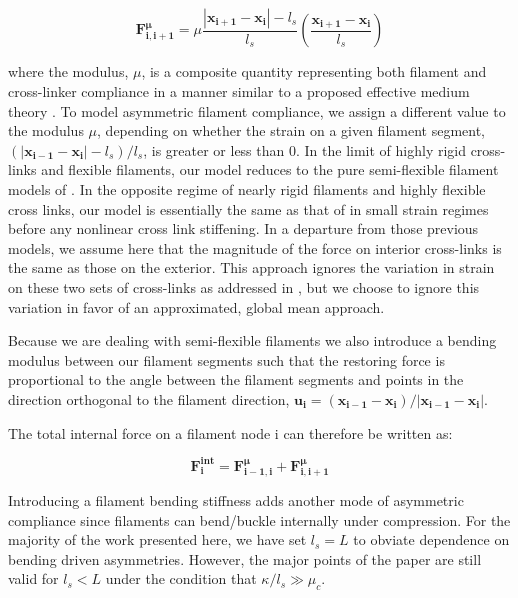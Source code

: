 \begin{equation}
\label{eqn:spring}
\mathbf{F^{\mu}_{i,i+1}} = \mu\frac{|\mathbf{x_{i+1}}-\mathbf{x_i}|-l_s}{l_s}\left ( \frac{\mathbf{x_{i+1}}-\mathbf{x_i}}{l_s}\right )
\end{equation}


where the modulus, $\mu$, is a composite quantity representing both filament and cross-linker compliance in a manner similar to a proposed effective medium theory \cite{theo_crosslinknonlinear}. To model asymmetric filament compliance, we assign a different value to the modulus $\mu$,  depending on whether the strain on a given filament segment, $(|\mathbf{x_{i-1}}-\mathbf{x_i}|-l_s)/l_s$, is greater or less than 0. In the limit of highly rigid cross-links and flexible filaments, our model reduces to the pure semi-flexible filament models of \cite{theo_hlm,theo_hlm2}. In the opposite regime of nearly rigid filaments and highly flexible cross links, our model is essentially the same as that of \cite{theo_crosslinknonlinear} in small strain regimes before any nonlinear cross link stiffening. In a departure from those previous models, we assume here that the magnitude of the force on interior cross-links is the same as those on the exterior. This approach ignores the variation in strain on these two sets of cross-links as addressed in \cite{theo_crosslinknonlinear}, but we choose to ignore this variation in favor of an approximated, global mean approach. 

Because we are dealing with semi-flexible filaments we also introduce a bending modulus between our filament segments such that the restoring force is proportional to the angle between the filament segments and points in the direction orthogonal to the filament direction, $\mathbf{u_i}=(\mathbf{x_{i-1}}-\mathbf{x_{i}})/|\mathbf{x_{i-1}}-\mathbf{x_{i}}|$.   


The total internal force on a filament node i can therefore be written as:

\begin{equation}
\label{eqn:internal}
\mathbf{F^{int}_i} = \mathbf{F^{\mu}_{i-1,i}} + \mathbf{F^{\mu}_{i,i+1}} 
\end{equation}

Introducing a filament bending stiffness adds another mode of asymmetric compliance since filaments can bend/buckle internally under compression. For the majority of the work presented here, we have set $l_s=L$ to obviate dependence on bending driven asymmetries. However, the major points of the paper are still valid for $l_s<L$ under the condition that $\kappa/l_s\gg\mu_c$. 


